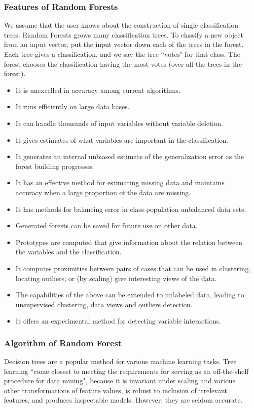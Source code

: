 \documentclass[document.tex]{subfiles}
\begin{document}
\subsubsection{Features of Random Forests}
We assume that the user knows about the construction of single classification trees. Random Forests grows many classification trees. To classify a new object from an input vector, put the input vector down each of the trees in the forest. Each tree gives a classification, and we say the tree ``votes" for that class. The forest chooses the classification having the most votes (over all the trees in the forest).
\begin{itemize}
	\item It is unexcelled in accuracy among current algorithms.
	\item It runs efficiently on large data bases.
	\item It can handle thousands of input variables without variable deletion.
	\item It gives estimates of what variables are important in the classification.
	\item It generates an internal unbiased estimate of the generalization error as the forest building progresses.
	\item It has an effective method for estimating missing data and maintains accuracy when a large proportion of the data are missing.
	\item It has methods for balancing error in class population unbalanced data sets.
	\item Generated forests can be saved for future use on other data.
	\item Prototypes are computed that give information about the relation between the variables and the classification.
	\item It computes proximities between pairs of cases that can be used in clustering, locating outliers, or (by scaling) give interesting views of the data.
	\item The capabilities of the above can be extended to unlabeled data, leading to unsupervised clustering, data views and outliers detection.
	\item It offers an experimental method for detecting variable interactions.
\end{itemize}
\subsubsection{Algorithm of Random Forest}
Decision trees are a popular method for various machine learning tasks. Tree learning ``come closest to meeting the requirements for serving as an off-the-shelf procedure for data mining", because it is invariant under scaling and various other transformations of feature values, is robust to inclusion of irrelevant features, and produces inspectable models. However, they are seldom accurate.
\end{document}
